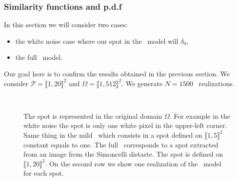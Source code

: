   \subsubsection{Similarity functions and p.d.f}
  In this section we will consider two cases:
  \begin{itemize}
  \item the white noise case where our spot in the \ADSN \ model will $\delta_0$,
  \item the full \ADSN \ model.
  \end{itemize}
  Our goal here is to confirm the results obtained in the previous section.
  We consider $\mathcal{P} = \llbracket 1,20 \rrbracket^2$ and $\Omega = \llbracket 1,512 \rrbracket^2$. We generate $N=1500$ \ADSN \ realizations.
  \begin{figure}[H]
    \centering
     \hfill
     \hfill
     \\
     \hfill
     \hfill
     \hfill
    \caption{The spot is represented in the original domain $\Omega$. For example in the white noise the spot is only one white pixel in the upper-left corner. Same thing in the mild \ADSN \ which consists in a spot defined on $\llbracket 1,5 \rrbracket^2$ constant equals to one. The full \ADSN \ corresponds to a spot extracted from an image from the Simoncelli distaste. The spot is defined on $\llbracket 1,20\rrbracket^2$. On the second row we show one realization of the \ADSN \ model for each spot.}
    \label{fig:spot}    
  \end{figure}
